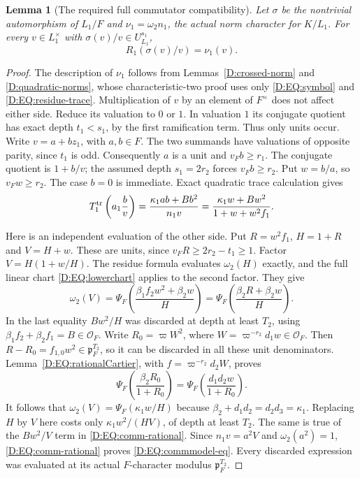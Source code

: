 \documentclass[11pt]{amsart}
\newtheorem{lemma}[theorem]{Lemma}
\theoremstyle{definition}
\theoremstyle{remark}
\newcommand{\OO}{\mathcal O}\newcommand{\pp}{\mathfrak p}\newcommand{\PP}{\mathfrak P}
\begin{document}
\begin{lemma}[The required full commutator compatibility]\label{D:EQ:commmodel}
Let $\sigma$ be the nontrivial automorphism of $L_1/F$ and
$\nu_1=\omega_2n_1$, the actual norm character for $K/L_1$.
For every $v\in L_1^\times$ with $\sigma(v)/v\in U_{L_1}^{s_1}$,
\begin{equation}\label{D:EQ:commmodel-eq}
 R_1(\sigma(v)/v)=\nu_1(v).
\end{equation}
\end{lemma}
\begin{proof}
The description of $\nu_1$ follows from Lemmas~\ref{D:crossed-norm}
and \ref{D:quadratic-norms}, whose characteristic-two proof uses only
\eqref{D:EQ:symbol} and \eqref{D:EQ:residue-trace}.
Multiplication of $v$ by an element of $F^\times$
does not affect either side. Reduce its valuation to $0$ or $1$.
In valuation $1$ its conjugate quotient has exact depth $t_1<s_1$,
by the first ramification term. Thus only units occur.
Write $v=a+bz_1$, with $a,b\in F$. The two summands have valuations of
opposite parity, since $t_1$ is odd. Consequently $a$ is a unit and
$v_Fb\ge r_1$. The conjugate quotient is $1+b/v$; the assumed depth
$s_1=2r_2$ forces $v_Fb\ge r_2$. Put $w=b/a$, so $v_Fw\ge r_2$.
The case $b=0$ is immediate. Exact quadratic trace calculation gives
\begin{equation}\label{D:EQ:comm-rational}
 T_1^{\rm tr}\left(a_1\frac b v\right)
   =\frac{\kappa_1ab+B b^2}{n_1v}
   =\frac{\kappa_1w+B w^2}{1+w+w^2f_1}.
\end{equation}

Here is an independent evaluation of the other side. Put
$R=w^2f_1$, $H=1+R$ and $V=H+w$. These are units, since
$v_FR\ge2r_2-t_1\ge1$. Factor $V=H(1+w/H)$.
The residue formula evaluates $\omega_2(H)$ exactly, and the full
linear chart \eqref{D:EQ:lowerchart} applies to the second factor. They give
\[
 \omega_2(V)=
 \Psi_F\left(\frac{\beta_1f_2w^2+\beta_2w}{H}\right)
 =\Psi_F\left(\frac{\beta_2R+\beta_2w}{H}\right).
\]
In the last equality $B w^2/H$ was discarded at depth at least $T_2$,
using $\beta_1f_2+\beta_2f_1=B\in\OO_F$.
Write $R_0=\varpi W^2$, where $W=\varpi^{-r_2}d_1w\in\OO_F$.
Then $R-R_0=f_{1,0}w^2\in\pp_F^{T_2}$, so it can be discarded in
all these unit denominators. Lemma~\ref{D:EQ:rationalCartier}, with
$f=\varpi^{-r_2}d_2W$, proves
\[
 \Psi_F\left(\frac{\beta_2R_0}{1+R_0}\right)
   =\Psi_F\left(\frac{d_1d_2w}{1+R_0}\right).
\]
It follows that $\omega_2(V)=\Psi_F(\kappa_1w/H)$ because
$\beta_2+d_1d_2=d_2d_3=\kappa_1$.
Replacing $H$ by $V$ here costs only $\kappa_1w^2/(HV)$, of depth
at least $T_2$. The same is true of the $B w^2/V$ term in
\eqref{D:EQ:comm-rational}. Since $n_1v=a^2V$ and $\omega_2(a^2)=1$,
\eqref{D:EQ:comm-rational} proves \eqref{D:EQ:commmodel-eq}.
Every discarded expression was evaluated at its actual $F$-character
modulus $\pp_F^{T_2}$.
\end{proof}
\end{document}
